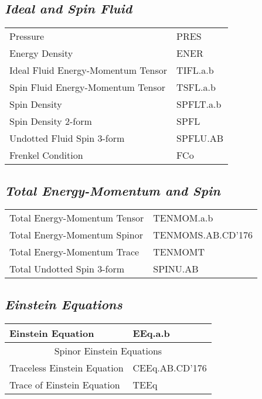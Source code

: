 \documentclass[twocolumn]{article}
\newcommand{\grgtt}{\ttfamily}
\renewcommand{\tt}{\grgtt}
\newcommand{\cc}{{\tt \char'176}}           %
\begin{document}
\subsection{\sf\slshape  Ideal and Spin Fluid}
\begin{tabular}{|l|l|}\hline
\tt    Pressure                           &\tt  PRES\\
\tt    Energy Density                     &\tt  ENER\\
\tt    Ideal Fluid Energy-Momentum Tensor &\tt  TIFL.a.b\\
\hline
\tt    Spin Fluid Energy-Momentum Tensor &\tt  TSFL.a.b \\
\tt    Spin Density                      &\tt  SPFLT.a.b \\
\tt    Spin Density 2-form               &\tt  SPFL \\
\tt    Undotted Fluid Spin 3-form        &\tt  SPFLU.AB \\
\tt    Frenkel Condition                 &\tt  FCo \\
\hline\end{tabular}

\subsection{\sf\slshape  Total Energy-Momentum and Spin}
\begin{tabular}{|l|l|}\hline
\tt    Total Energy-Momentum Tensor &\tt   TENMOM.a.b\\
\tt    Total Energy-Momentum Spinor &\tt   TENMOMS.AB.CD\cc\\
\tt    Total Energy-Momentum Trace  &\tt   TENMOMT\\
\tt    Total Undotted Spin 3-form   &\tt   SPINU.AB\\
\hline\end{tabular}

\subsection{\sf\slshape  Einstein Equations}
\begin{tabular}{|l|l|}\hline
\tt    Einstein Equation           &\tt   EEq.a.b\\
\hline
\multicolumn{2}{|c|}{\tt    Spinor Einstein Equations}\\
\tt    Traceless Einstein Equation &\tt   CEEq.AB.CD\cc\\
\tt    Trace of Einstein Equation  &\tt   TEEq\\
\hline\end{tabular}
\end{document}
